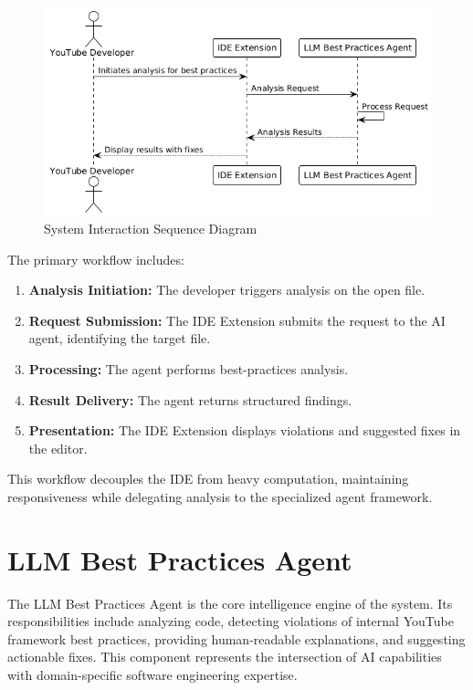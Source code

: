 \begin{spacing}{1.2}
\begin{figure}[H]
\centering
\includegraphics[scale=0.7]{images/sequence_diagram.png}
\caption{System Interaction Sequence Diagram}
\label{fig:sequence_diagram}
\end{figure}

The primary workflow includes:

\begin{enumerate}
    \item \textbf{Analysis Initiation:} The developer triggers analysis on the open file.
    \item \textbf{Request Submission:} The IDE Extension submits the request to the AI agent, identifying the target file.
    \item \textbf{Processing:} The agent performs best-practices analysis.
    \item \textbf{Result Delivery:} The agent returns structured findings.
    \item \textbf{Presentation:} The IDE Extension displays violations and suggested fixes in the editor.
\end{enumerate}

This workflow decouples the IDE from heavy computation, maintaining responsiveness while delegating analysis to the specialized agent framework.

\section{LLM Best Practices Agent}

The LLM Best Practices Agent is the core intelligence engine of the system. Its responsibilities include analyzing code, detecting violations of internal YouTube framework best practices, providing human-readable explanations, and suggesting actionable fixes. This component represents the intersection of AI capabilities with domain-specific software engineering expertise.


\end{spacing}

